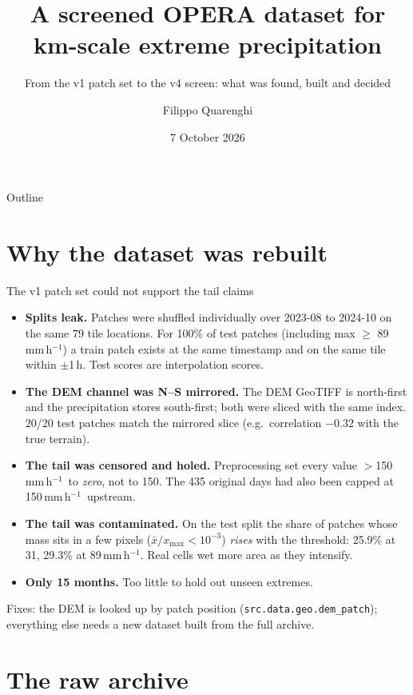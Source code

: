 \documentclass[aspectratio=169,10pt]{beamer}
\title{A screened OPERA dataset for km-scale extreme precipitation}
\subtitle{From the v1 patch set to the v4 screen: what was found, built and decided}
\author{Filippo Quarenghi}
\date{7 October 2026}
\newcommand{\mmh}{\,mm\,h$^{-1}$}
\newcommand{\code}[1]{\texttt{\small #1}}
\begin{document}
\begin{frame}
  \titlepage
\end{frame}

\begin{frame}{Outline}
  \tableofcontents
\end{frame}

\section{Why the dataset was rebuilt}

\begin{frame}{The v1 patch set could not support the tail claims}
  \small
  \begin{itemize}
    \item \textbf{Splits leak.} Patches were shuffled individually over 2023-08 to 2024-10 on
      the same 79 tile locations. For 100\% of test patches (including max $\ge$ 89\mmh) a
      train patch exists at the same timestamp and on the same tile within $\pm$1\,h. Test
      scores are interpolation scores.
    \item \textbf{The DEM channel was N--S mirrored.} The DEM GeoTIFF is north-first and the
      precipitation stores south-first; both were sliced with the same index. 20/20 test
      patches match the mirrored slice (e.g.\ correlation $-0.32$ with the true terrain).
    \item \textbf{The tail was censored and holed.} Preprocessing set every value $>$150\mmh\
      to \emph{zero}, not to 150. The 435 original days had also been capped at 150\mmh\
      upstream.
    \item \textbf{The tail was contaminated.} On the test split the share of patches whose
      mass sits in a few pixels ($\bar{x}/x_{\max} < 10^{-3}$) \emph{rises} with the
      threshold: 25.9\% at 31, 29.3\% at 89\mmh. Real cells wet more area as they intensify.
    \item \textbf{Only 15 months.} Too little to hold out unseen extremes.
  \end{itemize}
  \vspace{2mm}
  Fixes: the DEM is looked up by patch position (\code{src.data.geo.dem\_patch}); everything
  else needs a new dataset built from the full archive.
\end{frame}

\section{The raw archive}
\end{document}
